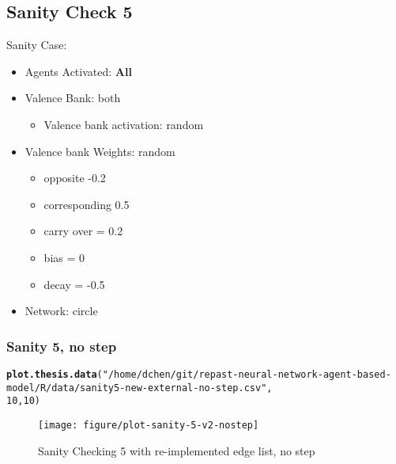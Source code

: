 \documentclass{article}\usepackage[]{graphicx}\usepackage[]{color}
\makeatletter
\def\maxwidth{ %
  \ifdim\Gin@nat@width>\linewidth
    \linewidth
  \else
    \Gin@nat@width
  \fi
}
\newcommand{\hlnum}[1]{\textcolor[rgb]{0.686,0.059,0.569}{#1}}%
\newcommand{\hlstr}[1]{\textcolor[rgb]{0.192,0.494,0.8}{#1}}%
\newcommand{\hlstd}[1]{\textcolor[rgb]{0.345,0.345,0.345}{#1}}%
\newcommand{\hlkwd}[1]{\textcolor[rgb]{0.737,0.353,0.396}{\textbf{#1}}}%
\newenvironment{kframe}{%
 \def\at@end@of@kframe{}%
 \ifinner\ifhmode%
  \def\at@end@of@kframe{\end{minipage}}%
  \begin{minipage}{\columnwidth}%
 \fi\fi%
 \def\FrameCommand##1{\hskip\@totalleftmargin \hskip-\fboxsep
 \colorbox{shadecolor}{##1}\hskip-\fboxsep
     \hskip-\linewidth \hskip-\@totalleftmargin \hskip\columnwidth}%
 \MakeFramed {\advance\hsize-\width
   \@totalleftmargin\z@ \linewidth\hsize
   \@setminipage}}%
 {\par\unskip\endMakeFramed%
 \at@end@of@kframe}
\newenvironment{knitrout}{}{} %
\makeatother
\begin{document}
\newpage
\subsection{Sanity Check 5}
\label{sec:sanity5}
Sanity Case:
\begin{itemize}
  \item Agents Activated: \textbf{All}
  \item Valence Bank: both
  \begin{itemize}
      \item Valence bank activation: random
  \end{itemize}
  \item Valence bank Weights: random
  \begin{itemize}
      \item opposite -0.2
      \item corresponding 0.5
      \item carry over = 0.2
      \item bias = 0
      \item decay = -0.5
  \end{itemize}
  \item Network: circle
\end{itemize}
%
%

\newpage
\subsubsection{Sanity 5, no step}
\begin{knitrout}
\color{fgcolor}\begin{kframe}
\begin{alltt}
\hlkwd{plot.thesis.data}\hlstd{(}\hlstr{"/home/dchen/git/repast-neural-network-agent-based-model/R/data/sanity5-new-external-no-step.csv"}\hlstd{,}
    \hlnum{10}\hlstd{,} \hlnum{10}\hlstd{)}
\end{alltt}
\end{kframe}\begin{figure}[]

\texttt{[image: figure/plot-sanity-5-v2-nostep]} \caption[Sanity Checking 5 with re-implemented edge list, no step]{Sanity Checking 5 with re-implemented edge list, no step\label{fig:plot-sanity-5-v2-nostep}}
\end{figure}


\end{knitrout}
\end{document}
